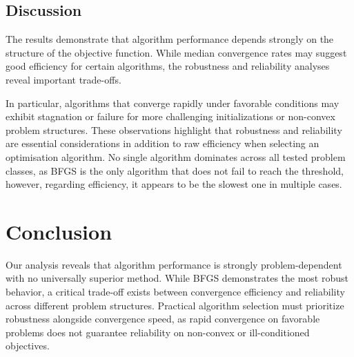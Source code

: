 \documentclass[12pt,a4paper]{article}
\begin{document}
\subsection{Discussion}
The results demonstrate that algorithm performance depends strongly on the structure of the objective function.
While median convergence rates may suggest good efficiency for certain algorithms, the robustness and reliability analyses reveal important trade-offs.

In particular, algorithms that converge rapidly under favorable conditions may exhibit stagnation or failure for more challenging initializations or non-convex problem structures.
These observations highlight that robustness and reliability are essential considerations in addition to raw efficiency when selecting an optimisation algorithm.
No single algorithm dominates across all tested problem classes, as BFGS is the only algorithm that does not fail to reach the threshold, however, regarding efficiency, it appears to be the slowest one in multiple cases.

\section{Conclusion}
Our analysis reveals that algorithm performance is strongly problem-dependent with no universally superior method. While BFGS demonstrates the most robust behavior, a critical trade-off exists between convergence efficiency and reliability across different problem structures. Practical algorithm selection must prioritize robustness alongside convergence speed, as rapid convergence on favorable problems does not guarantee reliability on non-convex or ill-conditioned objectives.
\end{document}
